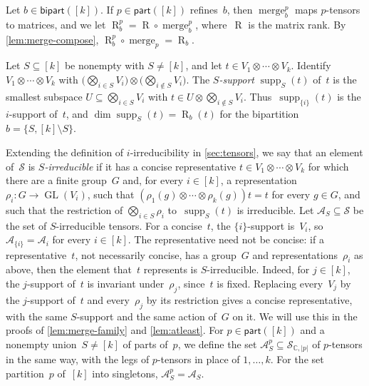 \documentclass[11pt,letterpaper]{article}
\DeclareMathOperator{\supp}{supp}
\DeclareMathOperator{\tensorrank}{R}
\DeclareMathOperator{\merge}{merge}
\newcommand{\parts}{\mathsf{part}}
\newcommand{\bipart}{\mathsf{bipart}}
\newcommand{\CC}{\mathbb{C}}
\DeclareMathOperator{\GL}{GL}
\begin{document}
Let $b \in \bipart([k])$. If $p \in \parts([k])$ refines~$b$, then $\merge^p_b$ maps $p$-tensors to matrices, and we let $\tensorrank^p_b = \tensorrank \circ \merge^p_b$, where~$\tensorrank$ is the matrix rank. By \cref{lem:merge-compose}, $\tensorrank^p_b \circ \merge_p = \tensorrank_b$.

Let $S \subseteq [k]$ be nonempty with $S \neq [k]$, and let $t \in V_1 \otimes \cdots \otimes V_k$. Identify $V_1 \otimes \cdots \otimes V_k$ with $\bigl( \bigotimes_{i \in S} V_i \bigr) \otimes \bigl( \bigotimes_{i \notin S} V_i \bigr)$. The \emph{$S$-support} $\supp_S(t)$ of~$t$ is the smallest subspace $U \subseteq \bigotimes_{i \in S} V_i$ with $t \in U \otimes \bigotimes_{i \notin S} V_i$. Thus~$\supp_{\{i\}}(t)$ is the $i$-support of~$t$, and $\dim \supp_S(t) = \tensorrank_b(t)$ for the bipartition $b = \{S, [k] \setminus S\}$. 

Extending the definition of $i$-irreducibility in \cref{sec:tensors}, we say that an element of~$\mathcal{S}$ is \emph{$S$-irreducible} if it has a concise representative $t \in V_1 \otimes \cdots \otimes V_k$ for which there are a finite group~$G$ and, for every $i \in [k]$, a representation $\rho_i : G \to \GL(V_i)$, such that $(\rho_1(g) \otimes \cdots \otimes \rho_k(g)) t = t$ for every $g \in G$, and such that the restriction of $\bigotimes_{i \in S} \rho_i$ to~$\supp_S(t)$ is irreducible. Let $\mathcal{A}_S \subseteq \mathcal{S}$ be the set of $S$-irreducible tensors. For a concise~$t$, the $\{i\}$-support is~$V_i$, so $\mathcal{A}_{\{i\}} = \mathcal{A}_i$ for every $i \in [k]$. The representative need not be concise: if a representative~$t$, not necessarily concise, has a group~$G$ and representations~$\rho_i$ as above, then the element that~$t$ represents is $S$-irreducible. Indeed, for $j \in [k]$, the $j$-support of~$t$ is invariant under~$\rho_j$, since~$t$ is fixed. Replacing every~$V_j$ by the $j$-support of~$t$ and every~$\rho_j$ by its restriction gives a concise representative, with the same $S$-support and the same action of~$G$ on it. We will use this in the proofs of \cref{lem:merge-family} and \cref{lem:atleast}. For $p \in \parts([k])$ and a nonempty union~$S \neq [k]$ of parts of~$p$, we define the set $\mathcal{A}^p_S \subseteq \mathcal{S}_{\CC,|p|}$ of $p$-tensors in the same way, with the legs of $p$-tensors in place of $1, \ldots, k$. For the set partition~$p$ of~$[k]$ into singletons, $\mathcal{A}^p_S = \mathcal{A}_S$.
\end{document}
